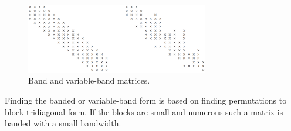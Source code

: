 \begin{figure}[H]
  \centering
    \includegraphics[width=8cm]{png/bandmatrix.png}
    \caption{Band and variable-band matrices.}
    \label{fig:bandedMatrix}
  \end{figure}

  \begin{rmk}
    Finding the banded or variable-band form is based on finding
    permutations to block tridiagonal form. If the blocks are small
    and numerous such a matrix is banded with a small bandwidth.
  \end{rmk}

